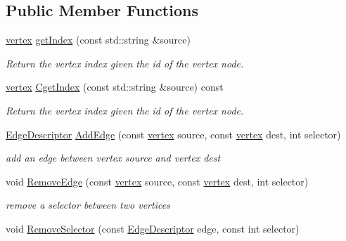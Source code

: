 \subsection*{Public Member Functions}
\begin{DoxyCompactItemize}
\item 
\hyperlink{graph_8hpp_abefdcf0544e601805af44eca032cca14}{vertex} \hyperlink{classoperations__graph__constructor_a7fea1a9469229de5a9d0658fdfe7e649}{get\+Index} (const std\+::string \&source)
\begin{DoxyCompactList}\small\item\em Return the vertex index given the id of the vertex node. \end{DoxyCompactList}\item 
\hyperlink{graph_8hpp_abefdcf0544e601805af44eca032cca14}{vertex} \hyperlink{classoperations__graph__constructor_a91455680ee973640d369629199ec3fe2}{Cget\+Index} (const std\+::string \&source) const
\begin{DoxyCompactList}\small\item\em Return the vertex index given the id of the vertex node. \end{DoxyCompactList}\item 
\hyperlink{graph_8hpp_a9eb9afea34e09f484b21f2efd263dd48}{Edge\+Descriptor} \hyperlink{classoperations__graph__constructor_a41852d0ad4ef4294f4bef6a2cc72b872}{Add\+Edge} (const \hyperlink{graph_8hpp_abefdcf0544e601805af44eca032cca14}{vertex} source, const \hyperlink{graph_8hpp_abefdcf0544e601805af44eca032cca14}{vertex} dest, int selector)
\begin{DoxyCompactList}\small\item\em add an edge between vertex source and vertex dest \end{DoxyCompactList}\item 
void \hyperlink{classoperations__graph__constructor_a4981f00da6eecc1c970c01dc68afe2be}{Remove\+Edge} (const \hyperlink{graph_8hpp_abefdcf0544e601805af44eca032cca14}{vertex} source, const \hyperlink{graph_8hpp_abefdcf0544e601805af44eca032cca14}{vertex} dest, int selector)
\begin{DoxyCompactList}\small\item\em remove a selector between two vertices \end{DoxyCompactList}\item 
void \hyperlink{classoperations__graph__constructor_a72af4bbb216d489edab5f844aced8767}{Remove\+Selector} (const \hyperlink{graph_8hpp_a9eb9afea34e09f484b21f2efd263dd48}{Edge\+Descriptor} edge, const int selector)

\end{DoxyCompactItemize}
